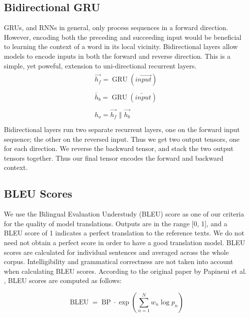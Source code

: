 \documentclass[twoside,twocolumn]{article}
\newlength\mystoreparindent
\newenvironment{myparindent}[1]{%
  \setlength{\mystoreparindent}{\the\parindent}
  \setlength{\parindent}{#1}
  }{%
  \setlength{\parindent}{\mystoreparindent}
}
\begin{document}
\begin{myparindent}{0pt}
\subsection{Bidirectional GRU}
GRUs, and RNNs in general, only process sequences in a forward direction.
However, encoding both the preceding and succeeding input would be beneficial
to learning the context of a word in its local vicinity. Bidirectional layers
allow models to encode inputs in both the forward and reverse direction. This
is a simple, yet poweful, extension to uni-directional recurrent layers.
\begin{equation}
  \label{eq:bidirectional}
  \begin{split}
    \begin{array}{ll}
      \overrightarrow{h_f} = \operatorname{GRU}(\overrightarrow{input})\\
      \\
      \overleftarrow{h_b} = \operatorname{GRU}(\overleftarrow{input})\\
      \\
      h_o = \overrightarrow{h_f} \,\,\Vert \,\, \overrightarrow{h_b}\\
    \end{array}
  \end{split}
\end{equation}
Bidirectional layers run two separate recurrent layers, one on the forward input
sequence; the other on the reversed input. Thus we get two output tensors, one
for each direction. We reverse the backward tensor, and stack the two output
tensors together. Thus our final tensor encodes the forward and backward
context.
\subsection{BLEU Scores}
\label{app:bleu}
We use the Bilingual Evaluation Understudy (BLEU) score as one of our criteria
for the quality of model translations. Outputs are in the range [0, 1], and a
BLEU score of 1 indicates a perfect translation to the reference texts.
We do not need not obtain a perfect score in order to have a good translation
model. BLEU scores are calculated for individual sentences and averaged across
the whole corpus. Intelligibility and grammatical correctness are not taken
into account when calculating BLEU scores. According to the original paper by
Papineni et al. \cite{papineni2002bleu}, BLEU scores are computed as follows:

\begin{equation}
  \operatorname{BLEU} = \operatorname{BP} \cdot \exp \left( \sum_{n=1}^N w_n \log p_n \right)
\end{equation}


\end{myparindent}
\end{document}
